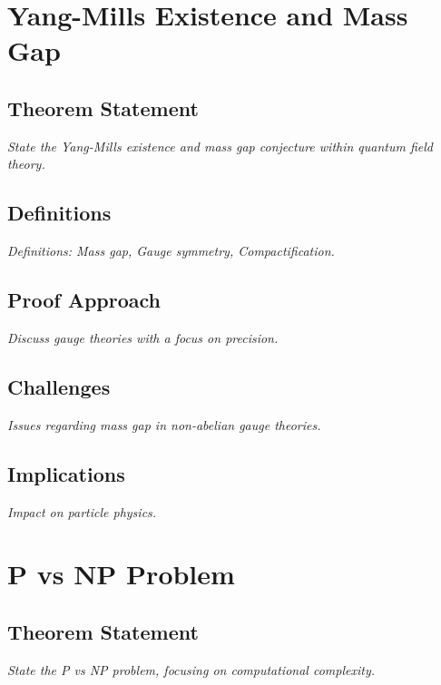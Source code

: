 \documentclass[12pt, a4paper]{article}
\begin{document}
\section{Yang-Mills Existence and Mass Gap}
\subsection{Theorem Statement}
\begin{theorem}
\label{thm:yang_mills}
\textit{State the Yang-Mills existence and mass gap conjecture within quantum field theory.}
\end{theorem}

\subsection{Definitions}
\textit{Definitions: Mass gap, Gauge symmetry, Compactification.}

\subsection{Proof Approach}
\textit{Discuss gauge theories with a focus on precision.}

\subsection{Challenges}
\textit{Issues regarding mass gap in non-abelian gauge theories.}

\subsection{Implications}
\textit{Impact on particle physics.}


\section{P vs NP Problem}
\subsection{Theorem Statement}
\begin{theorem}[P vs NP Problem]
\label{thm:p_vs_np}
\textit{State the P vs NP problem, focusing on computational complexity.}
\end{theorem}
\end{document}
